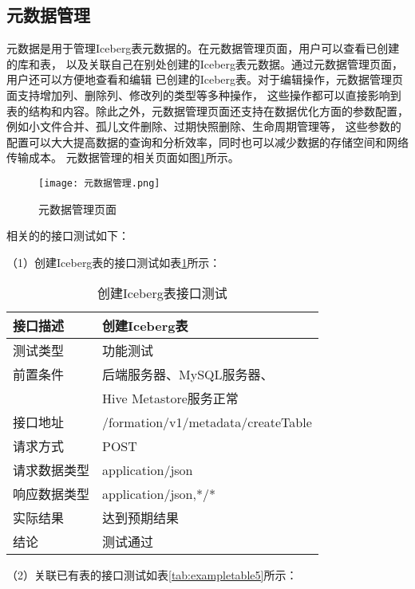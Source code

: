\subsection{元数据管理}

元数据是用于管理Iceberg表元数据的。在元数据管理页面，用户可以查看已创建的库和表，
以及关联自己在别处创建的Iceberg表元数据。通过元数据管理页面，用户还可以方便地查看和编辑
已创建的Iceberg表。对于编辑操作，元数据管理页面支持增加列、删除列、修改列的类型等多种操作，
这些操作都可以直接影响到表的结构和内容。除此之外，元数据管理页面还支持在数据优化方面的参数配置，
例如小文件合并、孤儿文件删除、过期快照删除、生命周期管理等，
这些参数的配置可以大大提高数据的查询和分析效率，同时也可以减少数据的存储空间和网络传输成本。
元数据管理的相关页面如图\ref{fig:元数据管理}所示。

\begin{figure}[H]
  \centering
  \texttt{[image: 元数据管理.png]}
  \caption{元数据管理页面}
  \label{fig:元数据管理}
\end{figure}

相关的的接口测试如下：

（1）创建Iceberg表的接口测试如表\ref{tab:exampletable4}所示：

\begin{table}[H]
  \centering
  \caption{创建Iceberg表接口测试}
  \label{tab:exampletable4}
  \begin{tabular}{ll}
    \toprule
    接口描述         & 创建Iceberg表         \\
    \midrule
    测试类型         & 功能测试         \\
    前置条件         & 后端服务器、MySQL服务器、      \\
                   &  Hive Metastore服务正常         \\
    接口地址       & /formation/v1/metadata/createTable        \\
    请求方式         & POST      \\
    请求数据类型         & application/json     \\
    响应数据类型         & application/json,*/*           \\
    实际结果         & 达到预期结果           \\
    结论            & 测试通过           \\
    \bottomrule
  \end{tabular}
\end{table}

（2）关联已有表的接口测试如表\ref{tab:exampletable5}所示：

